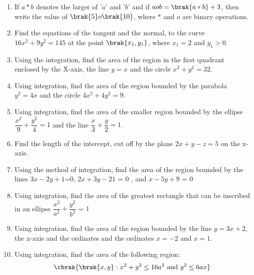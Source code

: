 \begin{enumerate}
	\item  If $a*b$ denotes the larger of '$a$' and '$b$' and if $a o b = \brak{a * b} + 3$, then write the value of $\brak{5} o \brak{10}$, where $*$ and $o$ are binary operations.
 \item Find the equations of the tangent and the normal, to the curve $16x^{2}+9y^{2}=145$ at the point $\brak{x_1,y_1}$, where $x_1=2$ and $y_1>0$.
 \item Using the integration, find the area of the region in the first quadrant enclosed by the X-axis, the line $y=x$ and the circle $x^{2}+y^{2}=32$.
\item Using integration, find the area of the region bounded by the parabola $y^{2}=4x$ and the circle $4x^{2}+4y^{2}=9$.
\item Using integration, find the area of the smaller region bounded by the ellipse $\dfrac{x^{2}}{9}+\dfrac{y^{2}}{4}=1$ and the line $\dfrac{x}{3}+\dfrac{y}{2}=1$.
\item Find the length of the intercept, cut off by the plane $2x+y-z=5$ on the x-axis.
\item Using the method of integration, find the area of the region bounded by the lines $3x-2y+1$=$0$, $2x+3y-21$ = $0$ , and  $x-5y+9$ = $0$
\item Using integration, find the area of the greatest rectangle that can be inscribed in an  ellipse $\dfrac{x^2}{a^2}+\dfrac{y^2}{b^2}$ = $1$
\item Using integration, find the area of the region bounded by the line $y = 3x + 2$, the x-axis and the ordinates and the ordinates $x=-2$ and $x=1$.

\item Using integration, find the area of the following region:
  \begin{align*}
  \cbrak{\brak{x,y}:x^{2}+y^{2}\leq 16a^{2} ~\text{and}~ y^{2}\leq 6ax}
  \end{align*}

\end{enumerate}
